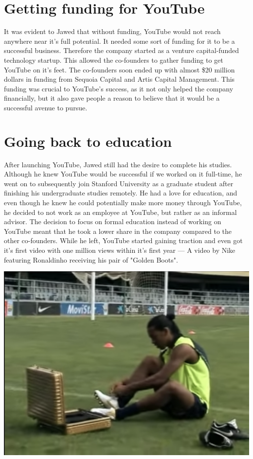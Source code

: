 \documentclass[12pt,a4paper]{article}
\begin{document}
\section{Getting funding for YouTube}\label{sec:meth}
It was evident to Jawed that without funding, YouTube would not reach anywhere near it's full potential. It needed some sort of funding for it to be a successful business. Therefore the company started as a venture capital-funded technology startup. This allowed the co-founders to gather funding to get YouTube on it's feet. The co-founders soon ended up with almost \$20 million dollars in funding from Sequoia Capital and Artis Capital Management. This funding was crucial to YouTube's success, as it not only helped the company financially, but it also gave people a reason to believe that it would be a successful avenue to pursue. 

\section{Going back to education}\label{sec:res}
After launching YouTube, Jawed still had the desire to complete his studies. Although he knew YouTube would be successful if we worked on it full-time, he went on to subsequently join Stanford University as a graduate student after finishing his undergraduate studies remotely. He had a love for education, and even though he knew he could potentially make more money through YouTube, he decided to not work as an employee at YouTube, but rather as an informal advisor. The decision to focus on formal education instead of working on YouTube meant that he took a lower share in the company compared to the other co-founders. While he left, YouTube started gaining traction and even got it's first video with one million views within it's first year — A video by Nike featuring Ronaldinho receiving his pair of "Golden Boots".

\begin{center}
\includegraphics[scale=0.4]{images/Ronaldinho.png}
\end{center}
\end{document}

